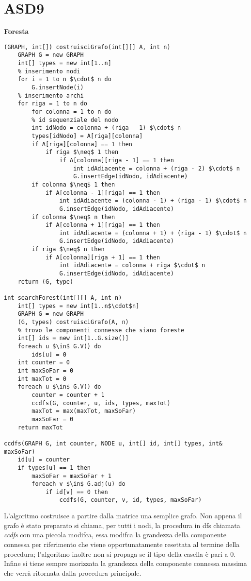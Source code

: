 \documentclass[../cheatSheetAlgoritmi.tex]{subfiles}
\begin{document}
\section{ASD9}
\textbf{Foresta}
\begin{lstlisting}[caption=Foresta con costruzione del grafo]
(GRAPH, int[]) costruisciGrafo(int[][] A, int n)
	GRAPH G = new GRAPH
  	int[] types = new int[1..n]
  	% inserimento nodi
  	for i = 1 to n $\cdot$ n do
    	G.insertNode(i)
  	% inserimento archi
  	for riga = 1 to n do
    	for colonna = 1 to n do
      	% id sequenziale del nodo
      	int idNodo = colonna + (riga - 1) $\cdot$ n
      	types[idNodo] = A[riga][colonna]
      	if A[riga][colonna] == 1 then
        	if riga $\neq$ 1 then 
          		if A[colonna][riga - 1] == 1 then 
            		int idAdiacente = colonna + (riga - 2) $\cdot$ n
            		G.insertEdge(idNodo, idAdiacente)
        if colonna $\neq$ 1 then
          	if A[colonna - 1][riga] == 1 then 
            	int idAdiacente = (colonna - 1) + (riga - 1) $\cdot$ n
            	G.insertEdge(idNodo, idAdiacente)
        if colonna $\neq$ n then
          	if A[colonna + 1][riga] == 1 then 
            	int idAdiacente = (colonna + 1) + (riga - 1) $\cdot$ n
            	G.insertEdge(idNodo, idAdiacente)
        if riga $\neq$ n then
          	if A[colonna][riga + 1] == 1 then 
            	int idAdiacente = colonna + riga $\cdot$ n
            	G.insertEdge(idNodo, idAdiacente)
  	return (G, type)

int searchForest(int[][] A, int n)
	int[] types = new int[1..n$\cdot$n]
  	GRAPH G = new GRAPH
  	(G, types) costruisciGrafo(A, n)
  	% trovo le componenti connesse che siano foreste
  	int[] ids = new int[1..G.size()]
  	foreach u $\in$ G.V() do
  		ids[u] = 0
  	int counter = 0
 	int maxSoFar = 0
  	int maxTot = 0
  	foreach u $\in$ G.V() do
    	counter = counter + 1
    	ccdfs(G, counter, u, ids, types, maxTot)
    	maxTot = max(maxTot, maxSoFar) 
    	maxSoFar = 0
  	return maxTot

ccdfs(GRAPH G, int counter, NODE u, int[] id, int[] types, int& maxSoFar)
	id[u] = counter
  	if types[u] == 1 then
  		maxSoFar = maxSoFar + 1
 		foreach v $\in$ G.adj(u) do
    		if id[v] == 0 then
      			ccdfs(G, counter, v, id, types, maxSoFar)
\end{lstlisting}
L'algoritmo costruisce a partire dalla matrice una semplice grafo. Non appena il grafo è stato preparato si chiama, per tutti i nodi, la procedura in dfs chiamata \textit{ccdfs} con una piccola modifca, essa modifca la grandezza della componente connessa per riferimento che viene opportunatamente resettata al termine della procedura; l'algoritmo inoltre non si propaga se il tipo della casella è pari a 0. Infine si tiene sempre morizzata la grandezza della componente connessa massima che verrà ritornata dalla procedura principale.
\end{document}

